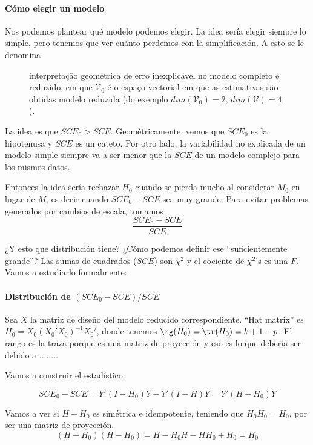 \paragraph{Cómo elegir un modelo}

Nos podemos plantear qué modelo podemos elegir. La idea sería elegir siempre lo simple, pero tenemos que ver cuánto perdemos con la simplificación. A esto se le denomina 

\begin{figure}[hbtp]
	\centering
	\caption{interpretação geométrica de erro inexplicável no modelo completo e reduzido, em que $\mathcal{V}_0$ é o espaço vectorial em que as estimativas são obtidas modelo reduzida (do exemplo $dim(\mathcal{V}_0)=2$, $dim(\mathcal{V})=4$).}
\end{figure}

La idea es que $SCE_0 > SCE$. Geométricamente, vemos que $SCE_0$ es la hipotenusa y $SCE$ es un cateto. Por otro lado, la variabilidad no explicada de un modelo simple siempre va a ser menor que la $SCE$ de un modelo complejo para los mismos datos.

Entonces la idea sería rechazar $H_0$ cuando se pierda mucho al considerar $M_0$ en lugar de $M$, es decir cuando $SCE_0 - SCE$ sea muy grande. Para evitar problemas generados por cambios de escala, tomamos \[\frac{SCE_0 - SCE}{SCE}\]

¿Y esto que distribución tiene? ¿Cómo podemos definir ese ``suficientemente grande''? Las sumas de cuadrados ($SCE$) son $\chi^2$ y el cociente de $\chi^2$'s es una $F$. Vamos a estudiarlo formalmente:


\paragraph{Distribución de $(SCE_0 - SCE)/SCE$}

Sea $X$ la matriz de diseño del modelo reducido correspondiente. ``Hat matrix'' es $H_0 = X_0(X_0'X_0)^{-1}X_0'$, donde tenemos $\rg(H_0) = \tr(H_0) = k+1-p$. El rango es la traza porque es una matriz de proyección y eso es lo que debería ser debido a ........

Vamos a construir el estadístico:

\[
SCE_0 - SCE = Y'(I-H_0)Y - Y'(I-H)Y = Y'(H-H_0)Y
\]

Vamos a ver si $H-H_0$ es simétrica e idempotente, teniendo que $H_0H_0 = H_0$, por ser una matriz de proyección.
\[
(H-H_0)(H-H_0) = H - H_0H - HH_0 + H_0 = H_0
\]

